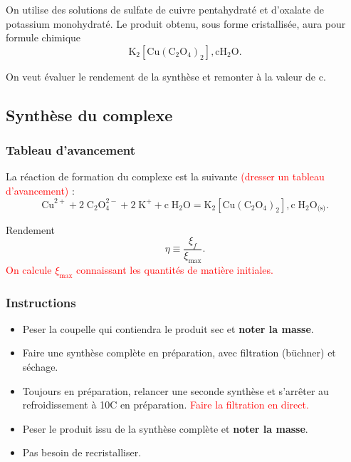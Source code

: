 \documentclass[11pt,a4paper]{report}
\begin{document}
On utilise des solutions de sulfate de cuivre pentahydraté et d'oxalate de potassium monohydraté. Le produit obtenu, sous forme cristallisée, aura pour formule chimique
\begin{equation}
	\boxed{\text{K}_2[\text{Cu}(\text{C}_2\text{O}_4)_2],\text{c}\text{H}_2\text{O}.}
\end{equation} 

On veut évaluer le rendement de la synthèse et remonter à la valeur de c.

\subsection{Synthèse du complexe}

\subsubsection*{Tableau d'avancement}
La réaction de formation du complexe est la suivante \textcolor{red}{(dresser un tableau d'avancement)} :
\begin{equation}
	\boxed{\text{Cu}^{2+} + 2\;\text{C}_2\text{O}_4^{2-} + 2\;\text{K}^+ 
	+ \text{c}\;\text{H}_2\text{O}
	= \text{K}_2[\text{Cu}(\text{C}_2\text{O}_4)_2],\text{c}\;\text{H}_2\text{O}_\text{(s)}}.
\end{equation}

Rendement
\begin{equation}
	\eta \equiv \frac{\xi_f}{\xi_\text{max}}.
\end{equation}
\textcolor{red}{On calcule $\xi_\text{max}$ connaissant les quantités de matière initiales.}

\subsubsection*{Instructions}
\begin{itemize}
	\item Peser la coupelle qui contiendra le produit sec et \textbf{noter la masse}.
	\item Faire une synthèse complète en préparation, avec filtration (büchner) et séchage.
	\item Toujours en préparation, relancer une seconde synthèse et s'arrêter au refroidissement 
		à 10\degree C en préparation. \textcolor{red}{Faire la filtration en direct.}
	\item Peser le produit issu de la synthèse complète et \textbf{noter la masse}.
	\item Pas besoin de recristalliser.
\end{itemize}
\end{document}
